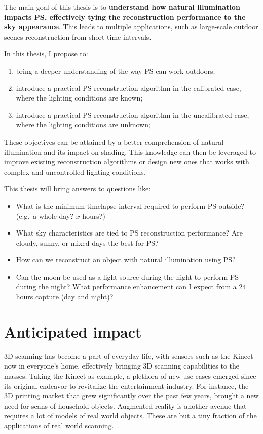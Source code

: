 The main goal of this thesis is to \textbf{understand how natural illumination impacts PS, effectively tying the reconstruction performance to the sky appearance}. This leads to multiple applications, such as large-scale outdoor scenes reconstruction from short time intervals.

In this thesis, I propose to:
\begin{enumerate}
  \item bring a deeper understanding of the way PS can work outdoors;
  \item introduce a practical PS reconstruction algorithm in the calibrated case, where the lighting conditions are known;
  \item introduce a practical PS reconstruction algorithm in the uncalibrated case, where the lighting conditions are unknown;
\end{enumerate}
These objectives can be attained by a better comprehension of natural illumination and its impact on shading. This knowledge can then be leveraged to improve existing reconstruction algorithms or design new ones that works with complex and uncontrolled lighting conditions.

This thesis will bring answers to questions like:
\begin{itemize}
  \item What is the minimum timelapse interval required to perform PS outside? (e.g.\ a whole day? $x$ hours?)
  \item What sky characteristics are tied to PS reconstruction performance? Are cloudy, sunny, or mixed days the best for PS?
  \item How can we reconstruct an object with natural illumination using PS?
  \item Can the moon be used as a light source during the night to perform PS during the night? What performance enhancement can I expect from a 24 hours capture (day and night)?
\end{itemize}

\section{Anticipated impact}

3D scanning has become a part of everyday life, with sensors such as the Kinect now in everyone's home, effectively bringing 3D scanning capabilities to the masses. Taking the Kinect as example, a plethora of new use cases emerged since its original endeavor to revitalize the entertainment industry. For instance, the 3D printing market that grew significantly over the past few years, brought a new need for scans of household objects. Augmented reality is another avenue that requires a lot of models of real world objects. These are but a tiny fraction of the applications of real world scanning.

